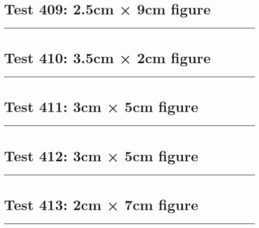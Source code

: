 \documentclass[a4paper,11pt]{article}
\begin{document}
\section*{Test 409: 2.5cm × 9cm figure}
\begin{swarmwrap}%
  \begin{minipage}[t]{2cm}
    \centering
    \rule{\linewidth}{9cm}
  \end{minipage}%
\end{swarmwrap}%
\swarmwrapnext
\lipsum[8]
\lipsum[9]
\lipsum[10]
\lipsum[11]
\lipsum[12]
\section*{Test 410: 3.5cm × 2cm figure}
\begin{swarmwrap}%
  \begin{minipage}[t]{3cm}
    \centering
    \rule{\linewidth}{2cm}
  \end{minipage}%
\end{swarmwrap}%
\swarmwrapnext
\lipsum[130]
\lipsum[131]
\lipsum[132]
\lipsum[133]
\lipsum[134]
\lipsum[135]
\section*{Test 411: 3cm × 5cm figure}
\begin{swarmwrap}%
  \begin{minipage}[t]{3cm}
    \centering
    \rule{\linewidth}{5cm}
  \end{minipage}%
\end{swarmwrap}%
\swarmwrapnext
\lipsum[22]
\lipsum[23]
\lipsum[24]
\lipsum[25]
\lipsum[26]
\lipsum[27]
\section*{Test 412: 3cm × 5cm figure}
\begin{swarmwrap}%
  \begin{minipage}[t]{3cm}
    \centering
    \rule{\linewidth}{5cm}
  \end{minipage}%
\end{swarmwrap}%
\swarmwrapnext
\lipsum[83]
\lipsum[84]
\lipsum[85]
\section*{Test 413: 2cm × 7cm figure}
\begin{swarmwrap}%
  \begin{minipage}[t]{2cm}
    \centering
    \rule{\linewidth}{7cm}
  \end{minipage}%
\end{swarmwrap}%
\swarmwrapnext
\lipsum[37]
\lipsum[38]
\lipsum[39]
\lipsum[40]
\end{document}
